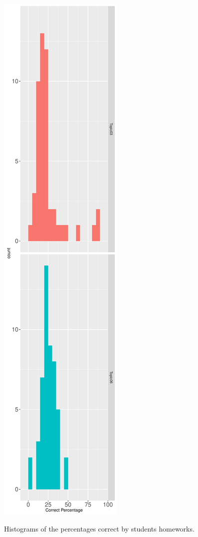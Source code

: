 \documentclass[12pt,nohyper]{tufte-handout}\usepackage[]{graphicx}\usepackage[]{color}
\begin{document}
\begin{marginfigure}\includegraphics[width=0.95\linewidth]{Stat101_SectionAB_histbystu}
\caption{\label{mar:hist}Histograms of the percentages correct by students homeworks.}\end{marginfigure}%
\end{document}
